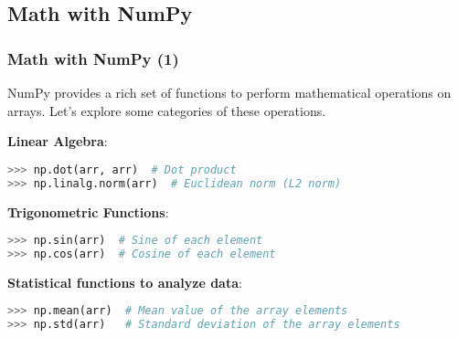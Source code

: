 \subsection*{Math with NumPy}
\begin{frame}[fragile]
  \frametitle{Math with NumPy (1)}
  NumPy provides a rich set of functions to perform mathematical operations on arrays. Let's explore some categories of these operations.\pause

  \textbf{Linear Algebra}:
  \begin{lstlisting}[language=Python, numbers=none]
>>> np.dot(arr, arr)  # Dot product
>>> np.linalg.norm(arr)  # Euclidean norm (L2 norm)
  \end{lstlisting}\pause

  \textbf{Trigonometric Functions}:
  \begin{lstlisting}[language=Python, numbers=none]
>>> np.sin(arr)  # Sine of each element
>>> np.cos(arr)  # Cosine of each element
  \end{lstlisting}

  \textbf{Statistical functions to analyze data}:
  \begin{lstlisting}[language=Python, numbers=none]
>>> np.mean(arr)  # Mean value of the array elements
>>> np.std(arr)   # Standard deviation of the array elements
  \end{lstlisting}\pause
\end{frame}

